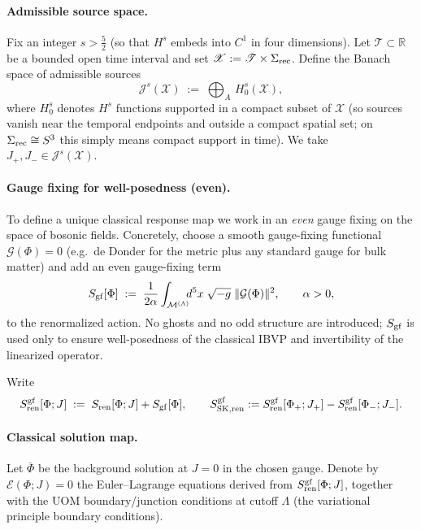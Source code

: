 \documentclass[10pt]{article}
\theoremstyle{definition}
\theoremstyle{plain}
\begin{document}
\paragraph{Admissible source space.}
Fix an integer $s>\frac{5}{2}$ (so that $H^s$ embeds into $C^1$ in four dimensions).
Let $\mathscr T\subset\mathbb R$ be a bounded open time interval and set $\mathscr X:=\mathscr T\times \Sigma_{\rm rec}$.
Define the Banach space of admissible sources
\begin{equation}
\mathcal J^s(\mathscr X)\;:=\;\bigoplus_{A}\,H^s_0(\mathscr X),
\label{eq:Js-def}
\end{equation}
where $H^s_0$ denotes $H^s$ functions supported in a compact subset of $\mathscr X$ (so sources vanish near the temporal endpoints
and outside a compact spatial set; on $\Sigma_{\rm rec}\cong S^3$ this simply means compact support in time).
We take $J_+,J_-\in\mathcal J^s(\mathscr X)$.

\paragraph{Gauge fixing for well-posedness (even).}
To define a unique classical response map we work in an \emph{even} gauge fixing on the space of bosonic fields.
Concretely, choose a smooth gauge-fixing functional $\mathcal G(\Phi)=0$ (e.g.\ de Donder for the metric plus any standard gauge for
bulk matter) and add an even gauge-fixing term
\begin{equation}
S_{\rm gf}[\Phi]\;:=\;\frac{1}{2\alpha}\int_{\mathcal M^{(\Lambda)}}\!\!\! d^5x\;\sqrt{-g}\;\|\mathcal G(\Phi)\|^2,
\qquad \alpha>0,
\label{eq:even-gauge-fixing}
\end{equation}
to the renormalized action.  No ghosts and no odd structure are introduced; $S_{\rm gf}$ is used only to ensure
well-posedness of the classical IBVP and invertibility of the linearized operator.

Write
\[
S_{\rm ren}^{\rm gf}[\Phi;J]\;:=\;S_{\rm ren}[\Phi;J]+S_{\rm gf}[\Phi],
\qquad
S_{\rm SK,ren}^{\rm gf}:=S_{\rm ren}^{\rm gf}[\Phi_+;J_+]-S_{\rm ren}^{\rm gf}[\Phi_-;J_-].
\]

\paragraph{Classical solution map.}
Let $\bar\Phi$ be the background solution at $J=0$ in the chosen gauge.
Denote by $\mathcal E(\Phi;J)=0$ the Euler--Lagrange equations derived from $S_{\rm ren}^{\rm gf}[\Phi;J]$, together with the UOM
boundary/junction conditions at cutoff $\Lambda$ (the variational principle boundary conditions).
\end{document}
